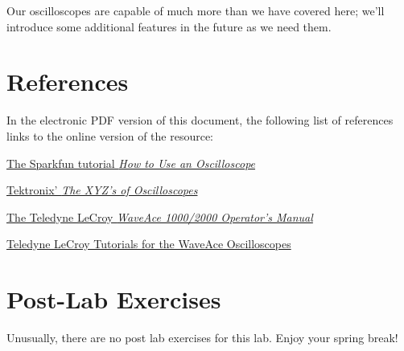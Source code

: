 \documentclass[12pt]{article}
\begin{document}
Our oscilloscopes are capable of much more than we have covered here;
we'll introduce some additional features in the future as we need
them. 

\section{References}
\label{sec:references}

In the electronic PDF version of this document, the following list of
references links to the online version of the resource:
\begin{compactitem}
\item
  \href{https://learn.sparkfun.com/tutorials/how-to-use-an-oscilloscope}{The
    Sparkfun tutorial \textit{How to Use an Oscilloscope}}
\item
  \href{http://ecee.colorado.edu/~mcclurel/txyzscopes.pdf}{Tektronix'
    \textit{The XYZ's of Oscilloscopes}}
\item \href{http://teledynelecroy.com/doc/docview.aspx?id=7670}{The
    Teledyne LeCroy \textit{WaveAce 1000/2000 Operator's Manual}}
\item \href{http://teledynelecroy.com/resources/details.aspx?doctypeid=23&mseries=402}{Teledyne LeCroy Tutorials for the WaveAce Oscilloscopes}
\end{compactitem}

  \newpage

  \section*{Post-Lab Exercises}

  Unusually, there are no post lab exercises for this lab.  Enjoy your
  spring break!
\end{document}

